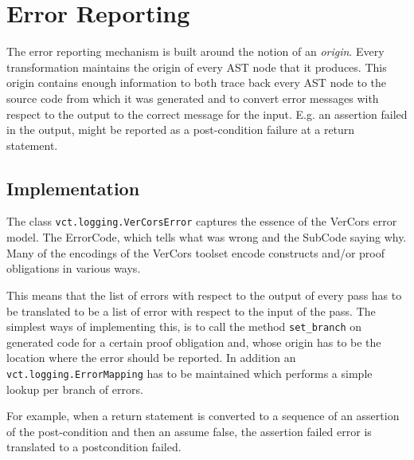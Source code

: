 \chapter{Error Reporting}

The error reporting mechanism is built around the notion of an \emph{origin}.
Every transformation maintains the origin of every AST node that it produces.
This origin contains enough information to both trace back every AST node
to the source code from which it was generated and to convert error
messages with respect to the output to the correct message for the input.
E.g. an assertion failed in the output, might be reported as a
post-condition failure at a return statement.


\section{Implementation}

The class \lstinline+vct.logging.VerCorsError+ captures the essence of the
VerCors error model. The ErrorCode, which tells what was wrong and the
SubCode saying why. Many of the encodings of the VerCors toolset
encode constructs and/or proof obligations in various ways.

This means that the list of errors with respect to the output of every pass
has to be translated to be a list of error with respect to the input of the
pass. The simplest ways of implementing this, is to call the
method \lstinline+set_branch+ on generated code for a certain proof obligation
and, whose origin has to be the location where the error should be reported.
In addition an \lstinline+vct.logging.ErrorMapping+ has to be maintained
which performs a simple lookup per branch of errors.

For example, when a return statement is converted to a sequence
of an assertion of the post-condition and then an assume false,
the assertion failed error is translated to a postcondition failed.


